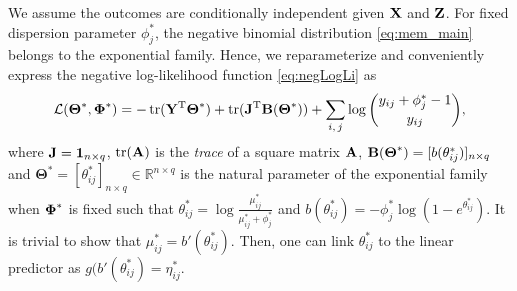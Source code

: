\documentclass[12pt]{article}
\def\trans{^{\rm T}}
\newcommand{\bbR}{\mathbb{R}}
\newcommand{\bbL}{\mathcal{L}}
\newcommand{\bs}{\boldsymbol}
\DeclareMathOperator{\Tr}{tr}
\begin{document}


We assume the outcomes are conditionally independent given ${\bf X}$ and ${\bf Z}$. %
For fixed dispersion parameter $\phi_j^*$, the negative binomial distribution \eqref{eq:mem_main} belongs to the exponential family. Hence, we reparameterize and  conveniently express the negative log-likelihood function \eqref{eq:negLogLi} as 
\begin{align}
\bbL(\bs\Theta^*, \bPhi^*)  = - \Tr(\Y\trans \bs\Theta^*) + \Tr({\J}\trans \bB(\bs\Theta^*)) + \sum_{i,\,j} \log {y_{ij} + \phi_j^* -1 \choose y_{ij}},
\label{eq:negLmat}
\end{align}
where ${\bf J} = {\bf 1}_{n \times q}$, $ \Tr( \A)$ is the \textit{trace} of a square  matrix ${\bf A}$, $\bB(\bs\Theta^*) =  [b(\theta_{ij}^*)]_{n \times q}$ and $\bs\Theta^* = [\theta_{ij}^*]_{n \times q} \in \bbR^{n \times q}$ is the natural parameter of the exponential family  when $\mbox{\boldmath $\Phi$}^*$ is fixed such that   $\theta_{ij}^* = \log\frac{\mu_{ij}^*}{\mu_{ij}^* + \phi_j^*}$ and $b(\theta_{ij}^*) = -\phi_j^*\log(1 - e^{\theta_{ij}^*})$. It is trivial to show that $\mu_{ij}^* = b'(\theta_{ij}^*)$. Then, one can link $\theta_{ij}^*$ to the linear predictor as $g(b'(\theta_{ij}^*) = \eta_{ij}^*$. 
\end{document}
